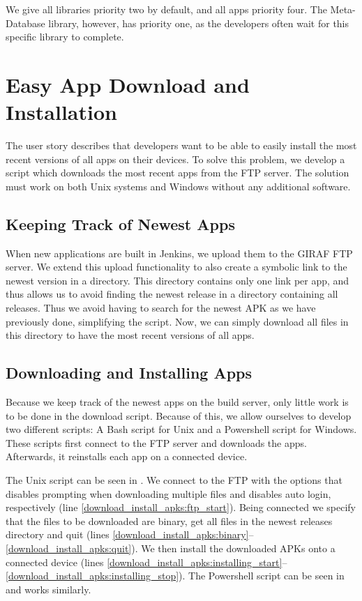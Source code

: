 We give all libraries priority two by default, and all apps priority four. The Meta-Database library, however, has priority one, as the developers often wait for this specific library to complete.

\section{Easy App Download and Installation}\label{sec:appdownloadscript}
The user story  describes that developers want to be able to easily install the most recent versions of all apps on their devices. To solve this problem, we develop a script which downloads the most recent apps from the FTP server. The solution must work on both Unix systems and Windows without any additional software.

\subsection{Keeping Track of Newest Apps}
When new applications are built in Jenkins, we upload them to the GIRAF FTP server. We extend this upload functionality to also create a symbolic link to the newest version in a  directory. This directory contains only one link per app, and thus allows us to avoid finding the newest release in a directory containing all releases. Thus we avoid having to search for the newest APK as we have previously done, simplifying the script. Now, we can simply download all files in this directory to have the most recent versions of all apps.

\subsection{Downloading and Installing Apps}
Because we keep track of the newest apps on the build server, only little work is to be done in the download script. Because of this, we allow ourselves to develop two different scripts: A Bash script for Unix and a Powershell script for Windows. These scripts first connect to the FTP server and downloads the apps. Afterwards, it reinstalls each app on a connected device.

The Unix script can be seen in . We connect to the FTP with the  options that disables prompting when downloading multiple files and disables auto login, respectively (line \ref{download_install_apks:ftp_start}). Being connected we specify that the files to be downloaded are binary, get all files in the newest releases directory and quit (lines \ref{download_install_apks:binary}--\ref{download_install_apks:quit}). We then install the downloaded APKs onto a connected device (lines \ref{download_install_apks:installing_start}--\ref{download_install_apks:installing_stop}). The Powershell script can be seen in  and works similarly.

